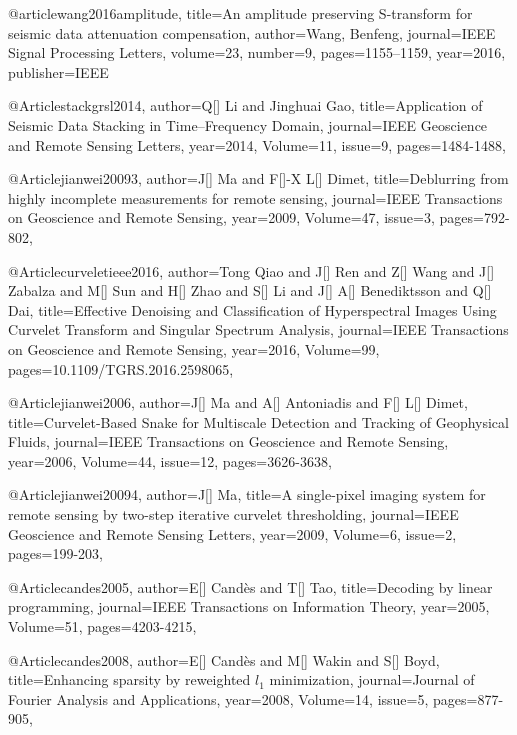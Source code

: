 {@article{wang2016amplitude,
  title={An amplitude preserving S-transform for seismic data attenuation compensation},
  author={Wang, Benfeng},
  journal={IEEE Signal Processing Letters},
  volume={23},
  number={9},
  pages={1155--1159},
  year={2016},
  publisher={IEEE}
}

 @Article{stackgrsl2014,
  author={Q[] Li and Jinghuai Gao},
  title={Application of Seismic Data Stacking in Time–Frequency Domain},
  journal={IEEE Geoscience and Remote Sensing Letters},
  year=2014,
  Volume=11,
  issue=9,
  pages={1484-1488},
}





@Article{jianwei20093,
  author={J[] Ma and F[]-X L[] Dimet},
  title={Deblurring from highly incomplete measurements for remote sensing},
  journal={IEEE Transactions on Geoscience and Remote Sensing},
  year=2009,
  Volume=47,
  issue=3,
  pages={792-802},
}

@Article{curveletieee2016,
  author={Tong Qiao and J[] Ren and Z[] Wang and J[] Zabalza and M[] Sun and H[] Zhao and S[] Li and J[] A[] Benediktsson and Q[] Dai},
  title={Effective Denoising and Classification of Hyperspectral Images Using Curvelet Transform and Singular Spectrum Analysis},
  journal={IEEE Transactions on Geoscience and Remote Sensing},
  year=2016,
  Volume=99,
  pages={10.1109/TGRS.2016.2598065},
}



@Article{jianwei2006,
  author={J[] Ma and A[] Antoniadis and F[] L[] Dimet},
  title={Curvelet-Based Snake for Multiscale Detection and Tracking of Geophysical Fluids},
  journal={IEEE Transactions on Geoscience and Remote Sensing},
  year=2006,
  Volume=44,
  issue=12,
  pages={3626-3638},
}

@Article{jianwei20094,
  author={J[] Ma},
  title={A single-pixel imaging system for remote sensing by two-step iterative curvelet
thresholding},
  journal={IEEE Geoscience and Remote Sensing Letters},
  year=2009,
  Volume=6,
  issue=2,
  pages={199-203},
}

@Article{candes2005,
  author={E[] Cand\`{e}s and T[] Tao},
  title={Decoding by linear programming},
  journal={IEEE Transactions on Information Theory},
  year=2005,
  Volume=51,
  pages={4203-4215},
}

@Article{candes2008,
  author={E[] Cand\`{e}s and M[] Wakin and S[] Boyd},
  title={Enhancing sparsity by reweighted $l_1$ minimization},
  journal={Journal of Fourier Analysis and Applications},
  year=2008,
  Volume=14,
  issue=5,
  pages={877-905},
}

}
